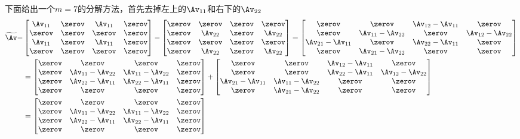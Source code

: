 \documentclass{ctexart}
\begin{document}
下面给出一个$m = 7$的分解方法，首先去掉左上的$\Av_{11}$和右下的$\Av_{22}$
\begin{align*}
    \widetilde{\Av} -
     &
    \begin{bmatrix}
        \Av_{11} & \zerov & \Av_{11} & \zerov \\
        \zerov   & \zerov & \zerov   & \zerov \\
        \Av_{11} & \zerov & \Av_{11} & \zerov \\
        \zerov   & \zerov & \zerov   & \zerov
    \end{bmatrix} -
    \begin{bmatrix}
        \zerov & \zerov & \zerov & \zerov \\ \zerov & \Av_{22} & \zerov & \Av_{22} \\ \zerov & \zerov & \zerov & \zerov \\ \zerov & \Av_{22} & \zerov & \Av_{22}
    \end{bmatrix} =
    \begin{bmatrix}
        \zerov & \zerov & \Av_{12} - \Av_{11} & \zerov \\ \zerov & \Av_{11} - \Av_{22} & \zerov & \Av_{12} - \Av_{22} \\ \Av_{21} - \Av_{11} & \zerov & \Av_{22} - \Av_{11} & \zerov \\ \zerov & \Av_{21} - \Av_{22} & \zerov & \zerov
    \end{bmatrix} \\
     & =
    \begin{bmatrix}
        \zerov & \zerov & \zerov & \zerov \\ \zerov & \Av_{11} - \Av_{22} & \Av_{11} - \Av_{22} & \zerov \\ \zerov & \Av_{22} - \Av_{11} & \Av_{22} - \Av_{11} & \zerov \\ \zerov & \zerov & \zerov & \zerov
    \end{bmatrix} +
    \begin{bmatrix}
        \zerov & \zerov & \Av_{12} - \Av_{11} & \zerov \\ \zerov & \zerov & \Av_{22} - \Av_{11} & \Av_{12} - \Av_{22} \\ \Av_{21} - \Av_{11} & \Av_{11} - \Av_{22} & \zerov & \zerov \\ \zerov & \Av_{21} - \Av_{22} & \zerov & \zerov
    \end{bmatrix} \\
     & = \begin{bmatrix}
             \zerov & \zerov & \zerov & \zerov \\ \zerov & \Av_{11} - \Av_{22} & \Av_{11} - \Av_{22} & \zerov \\ \zerov & \Av_{22} - \Av_{11} & \Av_{22} - \Av_{11} & \zerov \\ \zerov & \zerov & \zerov & \zerov

\end{bmatrix}
\end{align*}
\end{document}

